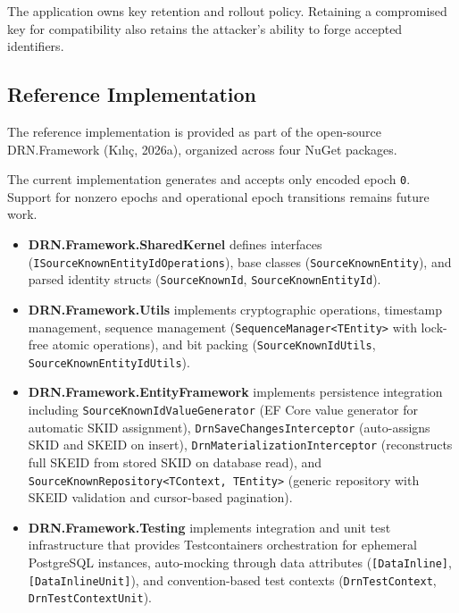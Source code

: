 \documentclass[fleqn,10pt,lineno]{wlpeerj}
\providecommand{\tightlist}{%
  \setlength{\itemsep}{0pt}\setlength{\parskip}{0pt}}
\begin{document}
The application owns key retention and rollout policy. Retaining a
compromised key for compatibility also retains the attacker's ability to
forge accepted identifiers.

\subsection{Reference Implementation}\label{reference-implementation}

The reference implementation is provided as part of the open-source
DRN.Framework (Kılıç, 2026a), organized across four NuGet packages.

The current implementation generates and accepts only encoded epoch
\texttt{0}. Support for nonzero epochs and operational epoch transitions
remains future work.

\begin{itemize}
\tightlist
\item
  \textbf{DRN.Framework.SharedKernel} defines interfaces
  (\texttt{ISourceKnownEntityIdOperations}), base classes
  (\texttt{SourceKnownEntity}), and parsed identity structs
  (\texttt{SourceKnownId}, \texttt{SourceKnownEntityId}).
\item
  \textbf{DRN.Framework.Utils} implements cryptographic operations,
  timestamp management, sequence management
  (\texttt{SequenceManager\textless{}TEntity\textgreater{}} with
  lock-free atomic operations), and bit packing
  (\texttt{SourceKnownIdUtils}, \texttt{SourceKnownEntityIdUtils}).
\item
  \textbf{DRN.Framework.EntityFramework} implements persistence
  integration including \texttt{SourceKnownIdValueGenerator} (EF Core
  value generator for automatic SKID assignment),
  \texttt{DrnSaveChangesInterceptor} (auto-assigns SKID and SKEID on
  insert), \texttt{DrnMaterializationInterceptor} (reconstructs full
  SKEID from stored SKID on database read), and
  \texttt{SourceKnownRepository\textless{}TContext,\ TEntity\textgreater{}}
  (generic repository with SKEID validation and cursor-based
  pagination).
\item
  \textbf{DRN.Framework.Testing} implements integration and unit test
  infrastructure that provides Testcontainers orchestration for
  ephemeral PostgreSQL instances, auto-mocking through data attributes
  (\texttt{{[}DataInline{]}}, \texttt{{[}DataInlineUnit{]}}), and
  convention-based test contexts (\texttt{DrnTestContext},
  \texttt{DrnTestContextUnit}).
\end{itemize}
\end{document}
